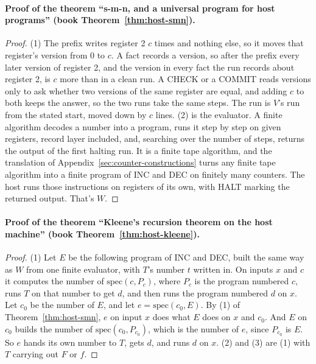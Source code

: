 \documentclass[11pt,twoside]{article}
\theoremstyle{thielethm}
\theoremstyle{thieledef}
\theoremstyle{thieledef}
\theoremstyle{thieledef}
\theoremstyle{thielethm}
\theoremstyle{thieleobs}
\theoremstyle{thielethm}
\begin{document}
\paragraph{Proof of the theorem ``s-m-n, and a universal program for host programs'' (book Theorem~\ref{thm:host-smn}).}
\begin{proof}
(1) The prefix writes register 2 $c$ times and nothing else, so it moves that register's version from
0 to $c$. A fact records a version, so after the prefix every later version of register 2, and the
version in every fact the run records about register 2, is $c$ more than in a clean run. A CHECK or a
COMMIT reads versions only to ask whether two versions of the same register are equal, and adding $c$
to both keeps the answer, so the two runs take the same steps. The run is $V$'s run from the stated
start, moved down by $c$ lines. (2) is the evaluator. A finite algorithm decodes a number into a program, runs it step by
step on given registers, record layer included, and, searching over the number of steps,
returns the output of the first halting run. It is a finite tape algorithm, and the translation
of Appendix~\ref{sec:counter-constructions} turns any finite tape algorithm into a finite program
of INC and DEC on finitely many counters. The host runs those instructions on registers of its
own, with HALT marking the returned output. That's $W$.
\end{proof}

\paragraph{Proof of the theorem ``Kleene's recursion theorem on the host machine'' (book Theorem~\ref{thm:host-kleene}).}
\begin{proof}
(1) Let $E$ be the following program of INC and DEC, built the same way as $W$ from one finite
evaluator, with $T$'s number $t$ written in. On inputs $x$ and $c$ it computes the number of $\mathrm{spec}(c, P_c)$, where $P_c$ is the
program numbered $c$, runs $T$ on that number to get $d$, and then runs the program numbered $d$ on
$x$. Let $c_0$ be the number of $E$, and let $e = \mathrm{spec}(c_0, E)$. By (1) of
Theorem~\ref{thm:host-smn}, $e$ on input $x$ does what $E$ does on $x$ and $c_0$. And $E$ on
$c_0$ builds the number of $\mathrm{spec}(c_0, P_{c_0})$, which is the number of $e$, since $P_{c_0}$
is $E$. So $e$ hands its own number to $T$, gets $d$, and runs $d$ on $x$. (2) and (3) are (1) with $T$
carrying out $F$ or $f$.
\end{proof}
\end{document}
